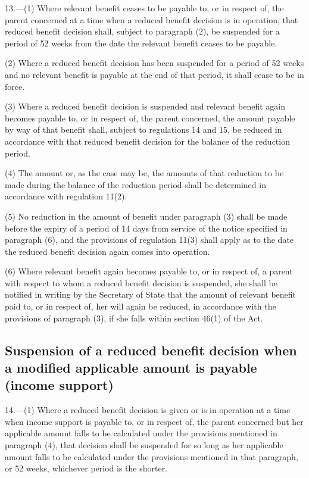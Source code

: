 \documentclass[12pt,a4paper]{article}
\begin{document}
13.---(1)  Where relevant benefit ceases to be payable to, or in respect of, the parent concerned at a time when a reduced benefit decision is in operation, that reduced benefit decision shall, subject to paragraph (2), be suspended for a period of 52 weeks from the date the relevant benefit ceases to be payable.

(2) Where a reduced benefit decision has been suspended for a period of 52 weeks and no relevant benefit is payable at the end of that period, it shall cease to be in force.

(3) Where a reduced benefit decision is suspended and relevant benefit again becomes payable to, or in respect of, the parent concerned, the amount payable by way of that benefit shall, subject to regulations 14 and 15, be reduced in accordance with that reduced benefit decision for the balance of the reduction period.

(4) The amount or, as the case may be, the amounts of that reduction to be made during the balance of the reduction period shall be determined in accordance with regulation 11(2).

(5) No reduction in the amount of benefit under paragraph (3) shall be made before the expiry of a period of 14 days from service of the notice specified in paragraph (6), and the provisions of regulation 11(3) shall apply as to the date the reduced benefit decision again comes into operation.

(6) Where relevant benefit again becomes payable to, or in respect of, a parent with respect to whom a reduced benefit decision is suspended, she shall be notified in writing by the Secretary of State that the amount of relevant benefit paid to, or in respect of, her will again be reduced, in accordance with the provisions of paragraph (3), if she falls within section 46(1) of the Act.

\subsection[14. Suspension of a reduced benefit decision when a modified applicable amount is payable (income support)]{Suspension of a reduced benefit decision when a modified applicable amount is payable (income support)}

14.---(1)  Where a reduced benefit decision is given or is in operation at a time when income support is payable to, or in respect of, the parent concerned but her applicable amount falls to be calculated under the provisions mentioned in paragraph (4), that decision shall be suspended for so long as her applicable amount falls to be calculated under the provisions mentioned in that paragraph, or 52 weeks, whichever period is the shorter.
\end{document}
